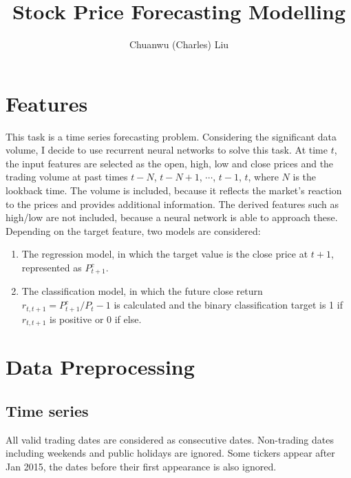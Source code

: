 \documentclass[a4paper, 11pt, usenatbib]{article}
\begin{document}
\title{Stock Price Forecasting Modelling}
\author{Chuanwu (Charles) Liu}

\maketitle



\section{Features}
This task is a time series forecasting problem. Considering the significant data volume, I decide to use recurrent neural networks to solve this task. At time $t$, the input features are selected as the open, high, low and close prices and the trading volume at past times $t-N$, $t-N+1$, $\cdots$, $t-1$, $t$, where $N$ is the lookback time. The volume is included, because it reflects the market's reaction to the prices and provides additional information. The derived features such as high/low are not included, because a neural network is able to approach these.
Depending on the target feature, two models are considered:
\begin{enumerate}
\item The regression model, in which the target value is the close price at $t+1$, represented as $P_{t+1}^c$.

\item The classification model, in which the future close return $r_{t, t+1} = P_{t+1}^c / P_t - 1$ is calculated and the binary classification target is 1 if $r_{t, t+1}$ is positive or 0 if else. 
\end{enumerate}

\section{Data Preprocessing}
\subsection{Time series}
All valid trading dates are considered as consecutive dates. Non-trading dates including weekends and public holidays are ignored. Some tickers appear after Jan 2015, the dates before their first appearance is also ignored.
\end{document}
